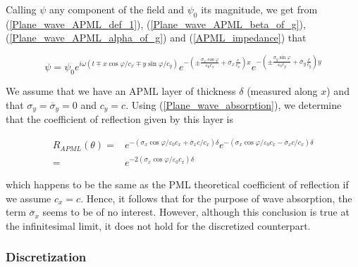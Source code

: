 Calling $\psi$ any component of the field and $\psi _{0}$
its magnitude, we get from (\ref{Plane_wave_APML_def_1}), (\ref{Plane_wave_APML_beta_of_g}),
(\ref{Plane_wave_APML_alpha_of_g}) and (\ref{APML_impedance}) that

\begin{equation}
\label{Plane_wave_absorption}
\psi =\psi _{0}e^{i\omega \left( t\mp x\cos \varphi /c_{x}\mp y\sin \varphi /c_{y}\right) }e^{-\left( \pm \frac{\sigma _{x}\cos \varphi }{\varepsilon _{0}c_{x}}+\overline{\sigma }_{x}\frac{c}{c_{x}}\right) x}e^{-\left( \pm \frac{\sigma _{y}\sin \varphi }{\varepsilon _{0}c_{y}}+\overline{\sigma }_{y}\frac{c}{c_{y}}\right) y}
\end{equation}


We assume that we have an APML layer of thickness $\delta$ (measured
along $x$) and that $\sigma _{y}=\overline{\sigma }_{y}=0$
and $c_{y}=c.$ Using (\ref{Plane_wave_absorption}), we determine
that the coefficient of reflection given by this layer is

\begin{eqnarray}
R_{APML}\left( \theta \right)  = & e^{-\left( \sigma _{x}\cos \varphi /\varepsilon _{0}c_{x}+\overline{\sigma }_{x}c/c_{x}\right) \delta }e^{-\left( \sigma _{x}\cos \varphi /\varepsilon _{0}c_{x}-\overline{\sigma }_{x}c/c_{x}\right) \delta }\nonumber \\
 = & e^{-2\left( \sigma _{x}\cos \varphi /\varepsilon _{0}c_{x}\right) \delta }
\end{eqnarray}


which happens to be the same as the PML theoretical coefficient of
reflection if we assume $c_{x}=c$. Hence, it follows that for
the purpose of wave absorption, the term $\overline{\sigma }_{x}$
seems to be of no interest. However, although this conclusion is true
at the infinitesimal limit, it does not hold for the discretized counterpart.

\subsubsection{Discretization}

